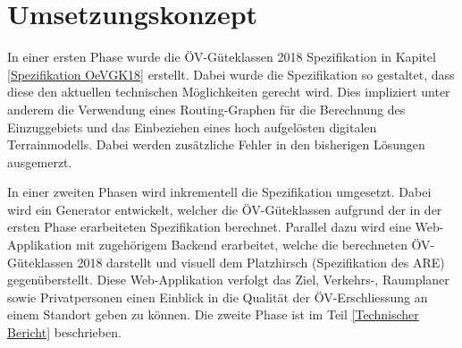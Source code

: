 
\section{Umsetzungskonzept}
\label{Umsetzungskonzept}

In einer ersten Phase wurde die \acs{ÖV}-Güteklassen 2018 Spezifikation in Kapitel \ref{Spezifikation OeVGK18} erstellt.
Dabei wurde die Spezifikation so gestaltet, dass diese den aktuellen technischen Möglichkeiten gerecht wird.
Dies impliziert unter anderem die Verwendung eines Routing-Graphen für die Berechnung des Einzuggebiets und das Einbeziehen eines hoch aufgelösten digitalen Terrainmodells.
Dabei werden zusätzliche Fehler in den bisherigen Lösungen ausgemerzt.

In einer zweiten Phasen wird inkrementell die Spezifikation umgesetzt.
Dabei wird ein Generator entwickelt, welcher die \acs{ÖV}-Güteklassen aufgrund der in der ersten Phase erarbeiteten Spezifikation berechnet.
Parallel dazu wird eine Web-Applikation mit zugehörigem Backend erarbeitet, welche die berechneten \acs{ÖV}-Güteklassen 2018 darstellt und visuell dem Platzhirsch (Spezifikation des \acl{ARE}) gegenüberstellt.
Diese Web-Applikation verfolgt das Ziel, Verkehrs-, Raumplaner sowie Privatpersonen einen Einblick in die Qualität der ÖV-Erschliessung an einem Standort geben zu können.
Die zweite Phase ist im Teil \ref{Technischer Bericht} beschrieben.
